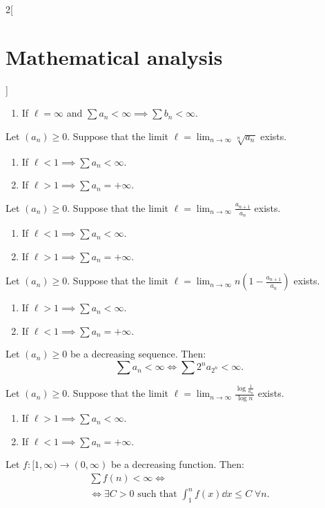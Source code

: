 \documentclass[../../../main.tex]{subfiles}
\begin{document}
\begin{multicols}{2}[\section{Mathematical analysis}]
\begin{theorem}
\begin{enumerate}
      \item If $\ell=\infty$ and $\sum a_n<\infty\implies\sum b_n<\infty$.
    \end{enumerate}
  \end{theorem}
  \begin{theorem}
    Let $(a_n)\geq 0$. Suppose that the limit $\displaystyle \ell=\lim_{n\to\infty}\sqrt[n]{a_n}$ exists.
    \begin{enumerate}
      \item If $\ell<1\implies\sum a_n<\infty$.
      \item If $\ell>1\implies\sum a_n=+\infty$.
    \end{enumerate}
  \end{theorem}
  \begin{theorem}
    Let $(a_n)\geq 0$. Suppose that the limit $\displaystyle \ell=\lim_{n\to\infty}\frac{a_{n+1}}{a_n}$ exists.
    \begin{enumerate}
      \item If $\ell<1\implies\sum a_n<\infty$.
      \item If $\ell>1\implies\sum a_n=+\infty$.
    \end{enumerate}
  \end{theorem}
  \begin{theorem}
    Let $(a_n)\geq 0$. Suppose that the limit $\displaystyle \ell=\lim_{n\to\infty}n\left(1-\frac{a_{n+1}}{a_n}\right)$ exists.
    \begin{enumerate}
      \item If $\ell>1\implies\sum a_n<\infty$.
      \item If $\ell<1\implies\sum a_n=+\infty$.
    \end{enumerate}
  \end{theorem}
  \begin{theorem}
    Let $(a_n)\geq 0$ be a decreasing sequence. Then: $$\textstyle\sum a_n<\infty\iff\sum 2^na_{2^n}<\infty.$$
  \end{theorem}
  \begin{theorem}
    Let $(a_n)\geq 0$. Suppose that the limit $\displaystyle \ell=\lim_{n\to\infty}\frac{\log\frac{1}{a_n}}{\log n}$ exists.
    \begin{enumerate}
      \item If $\ell>1\implies\sum a_n<\infty$.
      \item If $\ell<1\implies\sum a_n=+\infty$.
    \end{enumerate}
  \end{theorem}
  \begin{theorem}\label{MA_inttest}
    Let $f:[1,\infty)\rightarrow(0,\infty)$ be a decreasing function. Then:
    \begin{multline*}
      \textstyle\sum f(n)<\infty\iff\\ \displaystyle\iff\exists C>0\text{ such that }\int_1^nf(x)\dd x\leq C\;\forall n.
    \end{multline*}
  \end{theorem}

\end{multicols}
\end{document}
